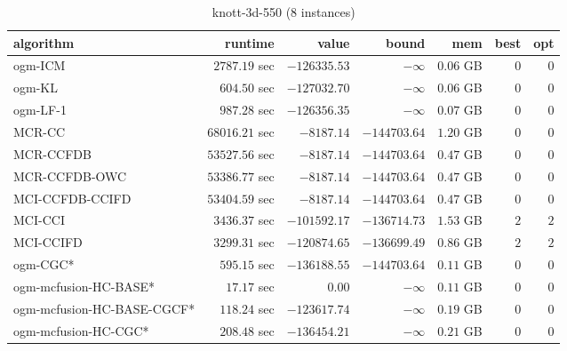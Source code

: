 \begin{table}[H]
\tiny
\centering
\caption{knott-3d-550 (8 instances)}
\label{tab:smalltable-knott-3d-550}
\begin{tabular}{lrrrrrr}
\toprule
           algorithm &       runtime     &         value &         bound &           mem &     best &      opt   \\ \midrule 
             ogm-ICM & $      2787.19$ sec & $   -126335.53$ & $-\infty$ & $         0.06$ GB & $       0$ & $       0$ \\ 
              ogm-KL & $       604.50$ sec & $   -127032.70$ & $-\infty$ & $         0.06$ GB & $       0$ & $       0$ \\ 
            ogm-LF-1 & $       987.28$ sec & $   -126356.35$ & $-\infty$ & $         0.07$ GB & $       0$ & $       0$ \\ 
\cmidrule{1-1} 
              MCR-CC & $     68016.21$ sec & $     -8187.14$ & $   -144703.64$ & $         1.20$ GB & $       0$ & $       0$ \\ 
           MCR-CCFDB & $     53527.56$ sec & $     -8187.14$ & $   -144703.64$ & $         0.47$ GB & $       0$ & $       0$ \\ 
       MCR-CCFDB-OWC & $     53386.77$ sec & $     -8187.14$ & $   -144703.64$ & $         0.47$ GB & $       0$ & $       0$ \\ 
\cmidrule{1-1} 
     MCI-CCFDB-CCIFD & $     53404.59$ sec & $     -8187.14$ & $   -144703.64$ & $         0.47$ GB & $       0$ & $       0$ \\ 
             MCI-CCI & $      3436.37$ sec & $   -101592.17$ & $   -136714.73$ & $         1.53$ GB & $       2$ & $       2$ \\ 
           MCI-CCIFD & $      3299.31$ sec & $   -120874.65$ & $   -136699.49$ & $         0.86$ GB & $       2$ & $       2$ \\ 
\cmidrule{1-1} 
            ogm-CGC* & $       595.15$ sec & $   -136188.55$ & $   -144703.64$ & $         0.11$ GB & $       0$ & $       0$ \\ 
ogm-mcfusion-HC-BASE* & $        17.17$ sec & $         0.00$ & $-\infty$ & $         0.11$ GB & $       0$ & $       0$ \\ 
ogm-mcfusion-HC-BASE-CGCF* & $       118.24$ sec & $   -123617.74$ & $-\infty$ & $         0.19$ GB & $       0$ & $       0$ \\ 
ogm-mcfusion-HC-CGC* & $       208.48$ sec & $   -136454.21$ & $-\infty$ & $         0.21$ GB & $       0$ & $       0$ \\ 

\end{tabular}
\end{table}
